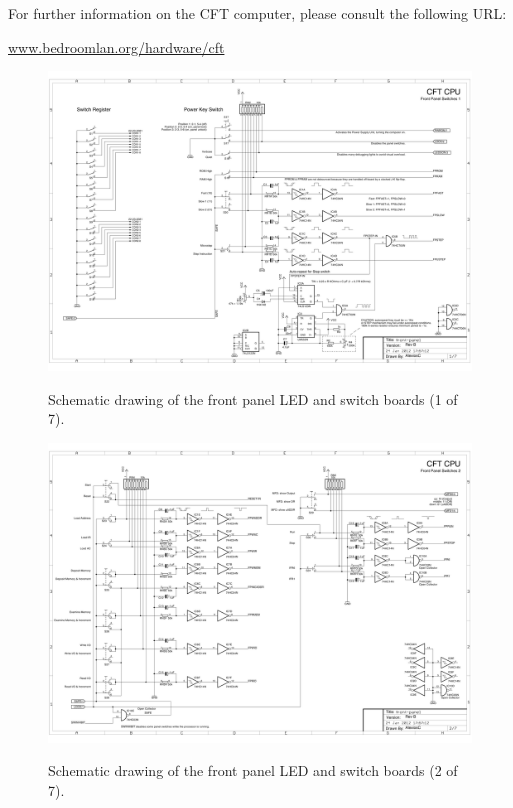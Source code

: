 \documentclass[11pt,a4paper,twocolumns]{article}
\newcommand\link[1]{\sf\href{http://#1}{#1}}
\begin{document}
For further information on the CFT computer, please consult the
following URL:

\begin{center}
\link{www.bedroomlan.org/hardware/cft}
\end{center}

\begin{figure}
\centering
\includegraphics[width=0.95\textheight,angle=90]{figs/front-panel-1.jpg}\\
\caption{\label{fig-schematic-front-panel-1}Schematic drawing of the front panel LED and switch boards (1 of 7).}
\end{figure}

\begin{figure}
\centering
\includegraphics[width=0.95\textheight,angle=90]{figs/front-panel-2.jpg}\\
\caption{\label{fig-schematic-front-panel-2}Schematic drawing of the front panel LED and switch boards (2 of 7).}
\end{figure}
\end{document}

